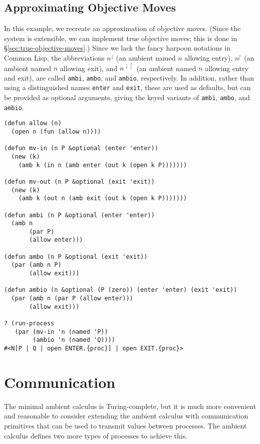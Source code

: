 \documentclass[12pt]{article}
\begin{document}
\subsection{Approximating Objective Moves}
\label{sec:approximating-objective-moves}

In this example, we recreate an approximation of objective moves.
(Since the system is extensible, we can implement true objective moves; this is done in \S\ref{sec:true-objective-moves}.)
Since we lack the fancy harpoon notations in Common Lisp, the abbreviations $n^\downharpoonleft$ (an ambient named $n$ allowing entry), $n^\upharpoonright$ (an ambient named $n$ allowing exit), and $n^{\downharpoonleft\upharpoonright}$ (an ambient named $n$ allowing entry and exit), are called \texttt{ambi}, \texttt{ambo}, and \texttt{ambio}, respectively.
In addition, rather than using a distinguished names \texttt{enter} and \texttt{exit}, these are used as defaults, but can be provided as optional arguments, giving the keyed variants of \texttt{ambi}, \texttt{ambo}, and \texttt{ambio}.

\begin{verbatim}
(defun allow (n)
  (open n (fun (allow n))))

(defun mv-in (n P &optional (enter 'enter))
  (new (k)
    (amb k (in n (amb enter (out k (open k P)))))))

(defun mv-out (n P &optional (exit 'exit))
  (new (k)
    (amb k (out n (amb exit (out k (open k P)))))))

(defun ambi (n P &optional (enter 'enter))
  (amb n
       (par P)
       (allow enter)))

(defun ambo (n P &optional (exit 'exit))
  (par (amb n P)
       (allow exit)))

(defun ambio (n &optional (P (zero)) (enter 'enter) (exit 'exit))
  (par (amb n (par P (allow enter)))
       (allow exit)))

? (run-process
   (par (mv-in 'n (named 'P))
        (ambio 'n (named 'Q))))
#<N[P | Q | open ENTER.{proc}] | open EXIT.{proc}>
\end{verbatim}

\section{Communication}
\label{sec:communication}

The minimal ambient calculus is Turing-complete, but it is much more convenient and reasonable to consider extending the ambient calculus with communication primitives that can be used to transmit values between processes.
The ambient calculus defines two more types of processes to achieve this.
\end{document}
